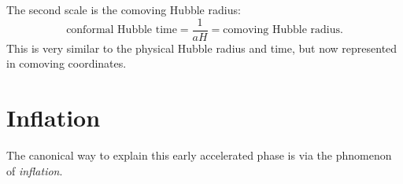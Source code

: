 The second scale is the comoving Hubble radius:
\begin{equation}
  \text{conformal Hubble time} = \frac{1}{aH} = \text{comoving Hubble radius}.
  \label{eqn:cos:com_Hubble_def}
\end{equation}
This is very similar to the physical Hubble radius and time, but now represented in comoving coordinates.

%
%


\section{Inflation}
The canonical way to explain this early accelerated phase is via the phnomenon of {\em inflation}.


\clearpage{}

